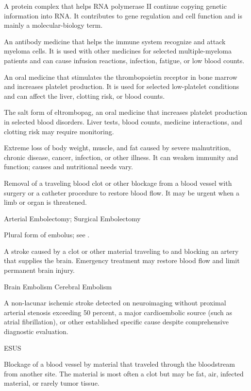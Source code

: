  A protein complex that helps RNA polymerase II continue copying genetic information into RNA. It contributes to gene regulation and cell function and is mainly a molecular-biology term.

 An antibody medicine that helps the immune system recognize and attack myeloma cells. It is used with other medicines for selected multiple-myeloma patients and can cause infusion reactions, infection, fatigue, or low blood counts.

 An oral medicine that stimulates the thrombopoietin receptor in bone marrow and increases platelet production. It is used for selected low-platelet conditions and can affect the liver, clotting risk, or blood counts.

 The salt form of eltrombopag, an oral medicine that increases platelet production in selected blood disorders. Liver tests, blood counts, medicine interactions, and clotting risk may require monitoring.

 Extreme loss of body weight, muscle, and fat caused by severe malnutrition, chronic disease, cancer, infection, or other illness. It can weaken immunity and function; causes and nutritional needs vary.

 Removal of a traveling blood clot or other blockage from a blood vessel with surgery or a catheter procedure to restore blood flow. It may be urgent when a limb or organ is threatened.

\synonyms
Arterial Embolectomy; Surgical Embolectomy

 Plural form of embolus; see .

 A stroke caused by a clot or other material traveling to and blocking an artery that supplies the brain. Emergency treatment may restore blood flow and limit permanent brain injury.

\synonyms
Brain Embolism
Cerebral Embolism

 A non-lacunar ischemic stroke detected on neuroimaging without proximal arterial stenosis exceeding 50 percent, a major cardioembolic source (such as atrial fibrillation), or other established specific cause despite comprehensive diagnostic evaluation.

\synonyms
ESUS

 Blockage of a blood vessel by material that traveled through the bloodstream from another site. The material is most often a clot but may be fat, air, infected material, or rarely tumor tissue.

